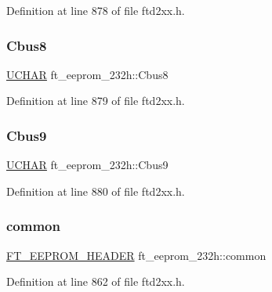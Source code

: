 Definition at line 878 of file ftd2xx.\+h.

\mbox{\label{structft__eeprom__232h_a4a05e570dda1b72a54e653264463436f}} 
\subsubsection{\texorpdfstring{Cbus8}{Cbus8}}
{\footnotesize\ttfamily \hyperlink{CatCaloProto40MHz_2inc_2WinTypes_8h_a4f4bb67531a9bf6f0b9c6ad76aeba587}{U\+C\+H\+AR} ft\+\_\+eeprom\+\_\+232h\+::\+Cbus8}



Definition at line 879 of file ftd2xx.\+h.

\mbox{\label{structft__eeprom__232h_ad995bc87428214d21c0c962cc4cc4e34}} 
\subsubsection{\texorpdfstring{Cbus9}{Cbus9}}
{\footnotesize\ttfamily \hyperlink{CatCaloProto40MHz_2inc_2WinTypes_8h_a4f4bb67531a9bf6f0b9c6ad76aeba587}{U\+C\+H\+AR} ft\+\_\+eeprom\+\_\+232h\+::\+Cbus9}



Definition at line 880 of file ftd2xx.\+h.

\mbox{\label{structft__eeprom__232h_a37234d2dd02343759c92fd97e4835ccb}} 
\subsubsection{\texorpdfstring{common}{common}}
{\footnotesize\ttfamily \hyperlink{LALUsbMLx64_2include_2ftd2xx_8h_ad5a6f519cd67a403fd8742756462394e}{F\+T\+\_\+\+E\+E\+P\+R\+O\+M\+\_\+\+H\+E\+A\+D\+ER} ft\+\_\+eeprom\+\_\+232h\+::common}



Definition at line 862 of file ftd2xx.\+h.

\mbox{\label{structft__eeprom__232h_a629a028c1c415f2f9104fe7e30154039}} 
